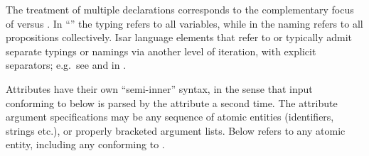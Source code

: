 \begin{isabellebody}
\begin{isamarkuptext}
  The treatment of multiple declarations corresponds to the
  complementary focus of \hyperlink{syntax.vars}{\mbox{}} versus \hyperlink{syntax.props}{\mbox{}}.  In
  ``'' the typing refers to all variables, while
  in  the naming refers to all propositions
  collectively.  Isar language elements that refer to \hyperlink{syntax.vars}{\mbox{}}
  or \hyperlink{syntax.props}{\mbox{}} typically admit separate typings or namings via
  another level of iteration, with explicit \hyperlink{keyword.and}{\mbox{}}
  separators; e.g.\ see \hyperlink{command.fix}{\mbox{}} and \hyperlink{command.assume}{\mbox{}} in
  .%
\end{isamarkuptext}%
\isamarkuptrue%
%
\isamarkuptrue%
%
\begin{isamarkuptext}%
Attributes have their own ``semi-inner'' syntax, in the sense
  that input conforming to \hyperlink{syntax.args}{\mbox{}} below is parsed by the
  attribute a second time.  The attribute argument specifications may
  be any sequence of atomic entities (identifiers, strings etc.), or
  properly bracketed argument lists.  Below \hyperlink{syntax.atom}{\mbox{}} refers to
  any atomic entity, including any \hyperlink{syntax.keyword}{\mbox{}} conforming to
  \hyperlink{syntax.symident}{\mbox{}}.


\end{isamarkuptext}
\end{isabellebody}
